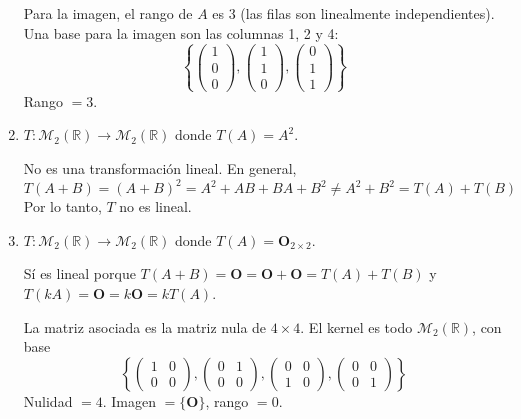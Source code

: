 \begin{prob}
\begin{enumerate}[$a)$]
\begin{myproof}
Para la imagen, el rango de $A$ es $3$ (las filas son linealmente independientes). Una base para la imagen son las columnas 1, 2 y 4:
\[
\left\{
\begin{pmatrix}1\\0\\0\end{pmatrix},
\begin{pmatrix}1\\1\\0\end{pmatrix},
\begin{pmatrix}0\\1\\1\end{pmatrix}
\right\}
\]
Rango $=3$.
\end{myproof}

\item $T:\mathcal{M}_{2}\left(\mathbb{R}\right) \rightarrow \mathcal{M}_{2}\left(\mathbb{R}\right)$ donde $
T(A)= A^{2}.$
\begin{myproof}
No es una transformación lineal. En general,
\[
T(A+B) = (A+B)^2 = A^2 + AB + BA + B^2 \neq A^2 + B^2 = T(A) + T(B)
\]
Por lo tanto, $T$ no es lineal.
\end{myproof}

\item $T:\mathcal{M}_{2}\left(\mathbb{R}\right) \rightarrow \mathcal{M}_{2}\left(\mathbb{R}\right)$ donde $T(A)=\mathbf{O}_{2\times 2}.$
\begin{myproof}
Sí es lineal porque $T(A+B) = \mathbf{O} = \mathbf{O} + \mathbf{O} = T(A) + T(B)$ y $T(kA) = \mathbf{O} = k\mathbf{O} = kT(A)$.

La matriz asociada es la matriz nula de $4\times 4$. El kernel es todo $\mathcal{M}_2(\mathbb{R})$, con base
\[
\left\{
\begin{pmatrix}1&0\\0&0\end{pmatrix},
\begin{pmatrix}0&1\\0&0\end{pmatrix},
\begin{pmatrix}0&0\\1&0\end{pmatrix},
\begin{pmatrix}0&0\\0&1\end{pmatrix}
\right\}
\]
Nulidad $=4$. Imagen $=\{\mathbf{O}\}$, rango $=0$.
\end{myproof}


\end{enumerate}
\end{prob}
